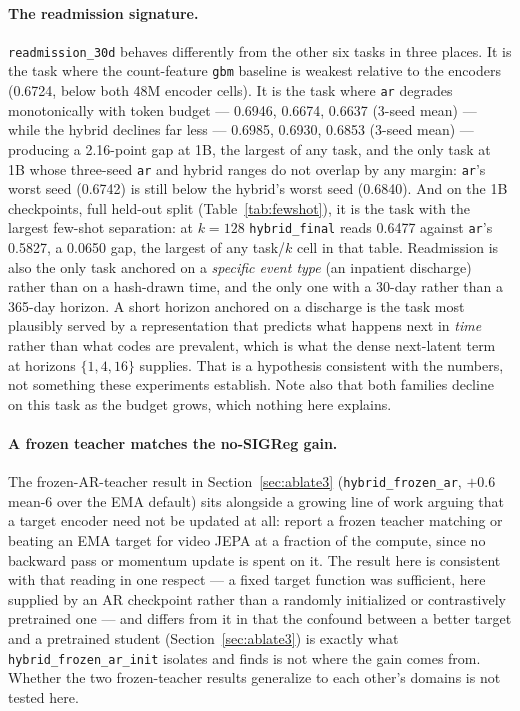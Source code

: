 \documentclass[11pt,a4paper]{article}
\newcommand{\code}[1]{\texttt{\small #1}}
\begin{document}
\paragraph{The readmission signature.}
\code{readmission\_30d} behaves differently from the other six tasks in three
places. It is the task where the count-feature \code{gbm} baseline is weakest
relative to the encoders (0.6724, below both 48M encoder cells). It is the task
where \code{ar} degrades monotonically with token budget --- 0.6946, 0.6674,
0.6637 (3-seed mean) --- while the hybrid declines far less --- 0.6985, 0.6930,
0.6853 (3-seed mean) --- producing a 2.16-point gap at 1B, the largest of any
task, and the only task at 1B whose three-seed \code{ar} and hybrid ranges do
not overlap by any margin: \code{ar}'s worst seed (0.6742) is still below the
hybrid's worst seed (0.6840). And on the 1B checkpoints, full held-out split
(Table~\ref{tab:fewshot}), it is the task with the largest few-shot
separation: at $k{=}128$ \code{hybrid\_final} reads 0.6477 against
\code{ar}'s 0.5827, a 0.0650 gap, the largest of any task/$k$ cell in that
table. Readmission is also the only task
anchored on a \emph{specific event type} (an inpatient discharge) rather than
on a hash-drawn time, and the only one with a 30-day rather than a 365-day
horizon. A short horizon anchored on a discharge is the task most plausibly
served by a representation that predicts what happens next in \emph{time}
rather than what codes are prevalent, which is what the dense next-latent
term at horizons $\{1, 4, 16\}$ supplies. That is a hypothesis consistent
with the numbers, not something these experiments establish. Note also that
both families decline on this task as the budget grows, which nothing here
explains.

\paragraph{A frozen teacher matches the no-SIGReg gain.} The frozen-AR-teacher
result in Section~\ref{sec:ablate3} (\code{hybrid\_frozen\_ar}, $+0.6$
mean-6 over the EMA default) sits alongside a growing line of work arguing
that a target encoder need not be updated at all: \citet{salt} report a
frozen teacher matching or beating an EMA target for video JEPA at a fraction
of the compute, since no backward pass or momentum update is spent on it.
The result here is consistent with that reading in one respect --- a fixed
target function was sufficient, here supplied by an AR checkpoint rather than
a randomly initialized or contrastively pretrained one --- and differs from
it in that the confound between a better target and a pretrained student
(Section~\ref{sec:ablate3}) is exactly what \code{hybrid\_frozen\_ar\_init}
isolates and finds is not where the gain comes from. Whether the two frozen-teacher
results generalize to each other's domains is not tested here.
\end{document}
